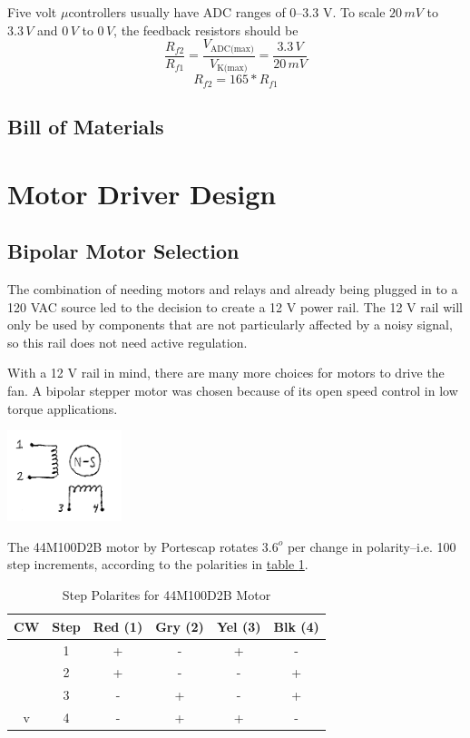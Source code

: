 \documentclass[10pt, twocolumn]{article}
\begin{document}
Five volt $\mu$controllers usually have ADC ranges of 0--3.3 V.
To scale $20\,mV$ to $3.3\,V$ and $0\,V$ to $0\,V$, the feedback resistors
should be
\begin{equation*}
	\frac{R_{f2}}{R_{f1}}=
	\frac{V_{\textrm{ADC(max)}}}{V_{\textrm{K(max)}}}=
	\frac{3.3\,V}{20\,mV}
\end{equation*}
\begin{equation}
R_{f2}=165*R_{f1}
\end{equation}

\subsection{Bill of Materials}

\section{Motor Driver Design}

\subsection{Bipolar Motor Selection}

The combination of needing motors and relays and already being plugged in to a 
120 VAC source led to the decision to create a 12 V power rail. The 12 V rail
will only be used by components that are not particularly affected by a noisy
signal, so this rail does not need active regulation.

With a 12 V rail in mind, there are many more choices for motors to drive the fan.
A bipolar stepper motor was chosen because of its open speed control in low torque applications.

\begin{center}
	\includegraphics[width=0.25\textwidth]{Figures/bipolar-motor.pdf}
\end{center}

The 44M100D2B motor by Portescap rotates $3.6^{o}$ per change in polarity--i.e. 100 step increments,
according to the polarities in
\hyperref[44M100D2B-polarities]{table \ref{44M100D2B-polarities}}.

\begin{table}
\centering
\caption{Step Polarites for 44M100D2B Motor}
\begin{tabular}{c | c | c | c | c | c}
\hline\hline
CW	&Step	&Red (1)&Gry (2)&Yel (3)&Blk (4)	\\
\hline\hline
\verb1|1	&1	&+	&-	&+	&-	\\
\verb1|1	&2	&+	&-	&-	&+	\\
\verb1|1	&3	&-	&+	&-	&+	\\
v		&4	&-	&+	&+	&-	\\
\hline\hline
\end{tabular}
\label{44M100D2B-polarities}
\end{table}
\end{document}

